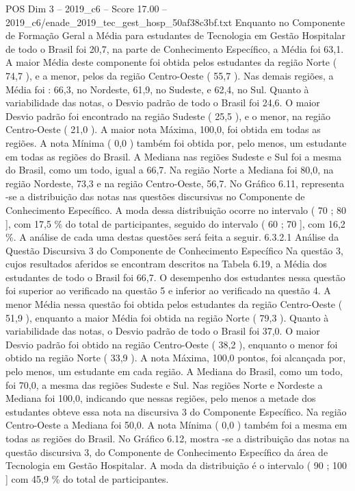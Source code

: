 \begin{textsample}{POS Dim 3 – 2019\_c6 – Score 17.00 – 2019\_c6/enade\_2019\_tec\_gest\_hosp\_50af38c3bf.txt}
Enquanto no Componente de Formação Geral a Média para estudantes de Tecnologia em Gestão Hospitalar de todo o Brasil foi 20,7, na parte de Conhecimento Específico, a Média foi 63,1.
A maior Média deste componente foi obtida pelos estudantes da região Norte ( 74,7 ), e a menor, pelos da região Centro-Oeste ( 55,7 ).
Nas demais regiões, a Média foi : 66,3, no Nordeste, 61,9, no Sudeste, e 62,4, no Sul.
Quanto à variabilidade das notas, o Desvio padrão de todo o Brasil foi 24,6.
O maior Desvio padrão foi encontrado na região Sudeste ( 25,5 ), e o menor, na região Centro-Oeste ( 21,0 ).
A maior nota Máxima, 100,0, foi obtida em todas as regiões.
A nota Mínima ( 0,0 ) também foi obtida por, pelo menos, um estudante em todas as regiões do Brasil.
A Mediana nas regiões Sudeste e Sul foi a mesma do Brasil, como um todo, igual a 66,7.
Na região Norte a Mediana foi 80,0, na região Nordeste, 73,3 e na região Centro-Oeste, 56,7.
No Gráfico 6.11, representa -se a distribuição das notas nas questões discursivas no Componente de Conhecimento Específico.
A moda dessa distribuição ocorre no intervalo ( 70 ; 80 ], com 17,5 \% do total de participantes, seguido do intervalo ( 60 ; 70 ], com 16,2 \%.
A análise de cada uma destas questões será feita a seguir. 6.3.2.1 Análise da Questão Discursiva 3 do Componente de Conhecimento Específico Na questão 3, cujos resultados aferidos se encontram descritos na Tabela 6.19, a Média dos estudantes de todo o Brasil foi 66,7.
O desempenho dos estudantes nessa questão foi superior ao verificado na questão 5 e inferior ao verificado na questão 4.
A menor Média nessa questão foi obtida pelos estudantes da região Centro-Oeste ( 51,9 ), enquanto a maior Média foi obtida na região Norte ( 79,3 ).
Quanto à variabilidade das notas, o Desvio padrão de todo o Brasil foi 37,0.
O maior Desvio padrão foi obtido na região Centro-Oeste ( 38,2 ), enquanto o menor foi obtido na região Norte ( 33,9 ).
A nota Máxima, 100,0 pontos, foi alcançada por, pelo menos, um estudante em cada região.
A Mediana do Brasil, como um todo, foi 70,0, a mesma das regiões Sudeste e Sul.
Nas regiões Norte e Nordeste a Mediana foi 100,0, indicando que nessas regiões, pelo menos a metade dos estudantes obteve essa nota na discursiva 3 do Componente Específico.
Na região Centro-Oeste a Mediana foi 50,0.
A nota Mínima ( 0,0 ) também foi a mesma em todas as regiões do Brasil.
No Gráfico 6.12, mostra -se a distribuição das notas na questão discursiva 3, do Componente de Conhecimento Específico da área de Tecnologia em Gestão Hospitalar.
A moda da distribuição é o intervalo ( 90 ; 100 ] com 45,9 \% do total de participantes.

\end{textsample}
